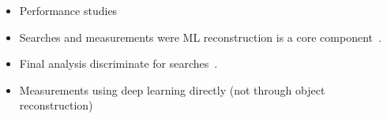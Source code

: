 \documentclass[12pt,letterpaper]{article}
\begin{document}
\begin{itemize}
	\begin{itemize}
		\item Performance studies~\cite{CMS:2022prd,Yang:2022dwu,NEOS-II:2022mov,Jiang:2022zho,Gronroos:2023qff}
		\item Searches and measurements were ML reconstruction is a core component~\cite{Keck:2018lcd,MicroBooNE:2021nxr,MicroBooNE:2021jwr,ATLAS:2023hbp}.
		\item Final analysis discriminate for searches~\cite{Aad:2019yxi,Aad:2020hzm,collaboration2020dijet,Sirunyan:2020hwz}.
		\item Measurements using deep learning directly (not through object reconstruction)~\cite{H1:2021wkz}
	\end{itemize}


\end{itemize}


\clearpage
\flushbottom
%


\end{document}
